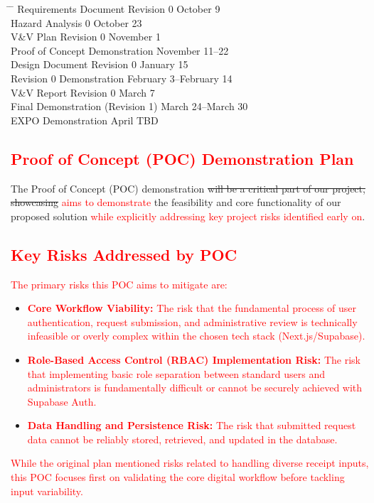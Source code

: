 \documentclass{article}
\begin{document}
\begin{tabbing}
  \hspace{8cm} \= \hspace{3cm} \= \kill
  Requirements Document Revision 0 \> October 9 \\
  Hazard Analysis 0 \> October 23 \\
  V\&V Plan Revision 0 \> November 1 \\
  Proof of Concept Demonstration \> November 11--22 \\
  Design Document Revision 0 \> January 15 \\
  Revision 0 Demonstration \> February 3--February 14 \\
  V\&V Report Revision 0 \> March 7 \\
  Final Demonstration (Revision 1) \> March 24--March 30 \\
  EXPO Demonstration \> April TBD \\
\end{tabbing}

\textcolor{red}{\section{Proof of Concept (POC) Demonstration Plan}}

\vspace{0.5cm}

The Proof of Concept (POC) demonstration \sout{will be a critical part of our project, showcasing} \textcolor{red}{aims to demonstrate} the feasibility and core functionality of our proposed solution \textcolor{red}{while explicitly addressing key project risks identified early on}.

\textcolor{red}{\subsection{Key Risks Addressed by POC}}
\textcolor{red}{The primary risks this POC aims to mitigate are:}
\begin{itemize}
    \item \textbf{\textcolor{red}{Core Workflow Viability:}} \textcolor{red}{The risk that the fundamental process of user authentication, request submission, and administrative review is technically infeasible or overly complex within the chosen tech stack (Next.js/Supabase).}
    \item \textbf{\textcolor{red}{Role-Based Access Control (RBAC) Implementation Risk:}} \textcolor{red}{The risk that implementing basic role separation between standard users and administrators is fundamentally difficult or cannot be securely achieved with Supabase Auth.}
    \item \textbf{\textcolor{red}{Data Handling and Persistence Risk:}} \textcolor{red}{The risk that submitted request data cannot be reliably stored, retrieved, and updated in the database.}
\end{itemize}
\textcolor{red}{While the original plan mentioned risks related to handling diverse receipt inputs, this POC focuses first on validating the core digital workflow before tackling input variability.}
\end{document}
